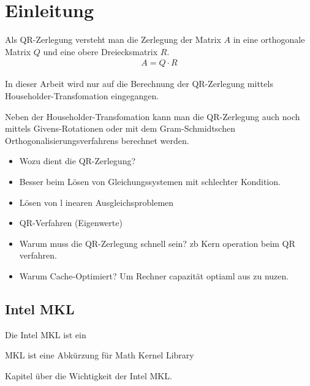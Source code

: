 \chapter{Einleitung}
Als QR-Zerlegung versteht man die Zerlegung der Matrix $A$ in eine  orthogonale Matrix $Q$ und eine obere Dreiecksmatrix $R$.
\begin{align*}
	A = Q \cdot R
\end{align*} 

In dieser Arbeit wird nur auf die Berechnung der QR-Zerlegung mittels Householder-Transfomation eingegangen. 

Neben der Householder-Transfomation kann man die QR-Zerlegung auch noch mittels Givens-Rotationen oder mit dem Gram-Schmidtschen Orthogonalisierungsverfahrens berechnet werden.




\begin{itemize}
	\item Wozu dient die QR-Zerlegung?
	
	\item Besser beim Lösen von Gleichungssystemen mit schlechter Kondition.
	
	\item Lösen von l	inearen Ausgleichsproblemen
	
	\item QR-Verfahren (Eigenwerte)
	
	\item Warum muss die QR-Zerlegung schnell sein? zb Kern operation beim QR verfahren.
	
	\item Warum Cache-Optimiert? Um Rechner capazität optiaml aus zu nuzen.
\end{itemize}


\section{Intel MKL}

Die Intel MKL ist ein


MKL ist eine Abkürzung für Math Kernel Library 

Kapitel über die Wichtigkeit der Intel MKL.


